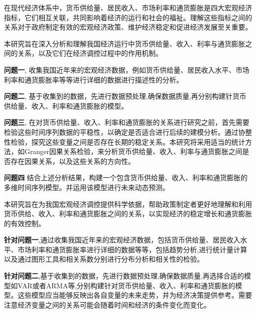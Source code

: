 \setcounter{page}{1}




在现代经济体系中，货币供给量、居民收入、市场利率和通货膨胀是四大宏观经济指标，它们相互关联，共同影响着经济的运行和社会的福祉。理解这些指标之间的关系对于政府制定有效的宏观经济政策、维护经济稳定和促进经济发展至关重要。


本研究旨在深入分析和理解我国经济运行中货币供给量、收入、利率与通货膨胀之间的关系，以及它们在经济调控过程中的作用机制。

\textbf {问题一},
收集我国近年来的宏观经济数据，例如货币供给量、居民收入水平、市场利率和通货膨胀率等等进行详细的数据进行描述性的分析。

\textbf {问题二},
基于收集到的数据，先进行数据预处理,确保数据质量,再分别构建针货币供给量、收入、利率和通货膨胀的模型。

\textbf {问题三},
在对货币供给量、收入、利率和通货膨胀的关系进行研究之前，首先需要检验这些时间序列数据的平稳性，以确定是否适合进行后续的建模分析。通过协整性检验，探究这些变量之间是否存在长期的稳定关系。本研究将采用适当的统计方法，如Granger因果关系检验，来分析货币供给量、收入、利率与通货膨胀之间是否存在因果关系，以及这些关系的方向性。

\textbf {问题四} 结合上述分析结果，构建一个包含货币供给量、收入、利率和通货膨胀的多维时间序列模型。并运用该模型进行未来动态预测。

本研究旨在为我国宏观经济调控提供科学依据，帮助政策制定者更好地理解和利用货币供给、收入、利率和通货膨胀之间的关系，以实现经济的稳定增长和通货膨胀的有效控制。





\textbf {针对问题一},通过收集我国近年来的宏观经济数据，包括货币供给量、居民收入水平、市场利率和通货膨胀率进行详细的数据等等，包括趋势分析,进行统计量计算以及通过图形工具和相关系数分别进行分布分析和相关性的检验。


\textbf {针对问题二},基于收集到的数据，先进行数据预处理,确保数据质量,再选择合适的模型如VAR或者ARMA等,分别构建针对货币供给量、收入、利率和通货膨胀的模型。这些模型应当能够反映出各自变量的未来走势，并为经济决策提供参考。需要注意经济变量之间的关系可能会随着时间和经济的条件变化而变化。

